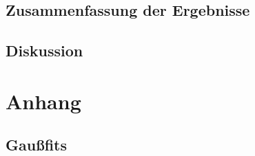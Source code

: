 \documentclass[12pt]{article}
\begin{document}
\subsection{Zusammenfassung der Ergebnisse}



\subsection{Diskussion}


\newpage
\section{Anhang} 
\subsection{Gaußfits}
\label{fitergebnisse}
\end{document}
